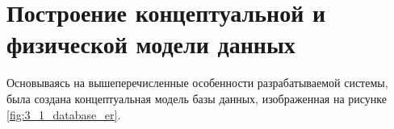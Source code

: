 \documentclass[../nirs.tex]{subfiles}
\begin{document}
\section{Построение концептуальной и физической модели данных}
Основываясь на вышеперечисленные особенности разрабатываемой системы, была
создана концептуальная модель базы данных, изображенная на рисунке
\ref{fig:3_1_database_er}.
\end{document}
